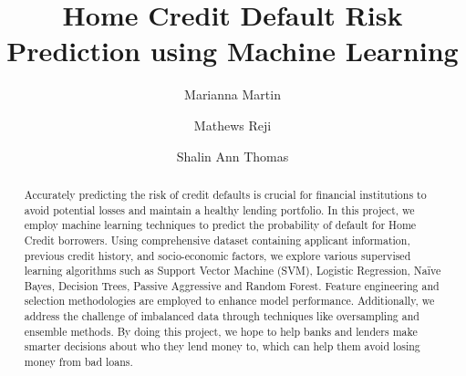 \documentclass{josis}
\begin{document}

\title{Home Credit Default Risk Prediction using Machine Learning}

\author{Marianna Martin}
\author{Mathews Reji}
\author{Shalin Ann Thomas}
\date{}
\maketitle


\begin{abstract}
Accurately predicting the risk of credit defaults is crucial for financial institutions to avoid potential losses and maintain a healthy lending portfolio. In this project, we employ machine learning techniques to predict the probability of default for Home Credit borrowers. Using comprehensive dataset containing applicant information, previous credit history, and socio-economic factors, we explore various supervised learning algorithms such as Support Vector Machine (SVM), Logistic Regression, Naïve Bayes, Decision Trees, Passive Aggressive and Random Forest. Feature engineering and selection methodologies are employed to enhance model performance. Additionally, we address the challenge of imbalanced data through techniques like oversampling and ensemble methods. By doing this project, we hope to help banks and lenders make smarter decisions about who they lend money to, which can help them avoid losing money from bad loans.
\end{abstract}

\end{document}
